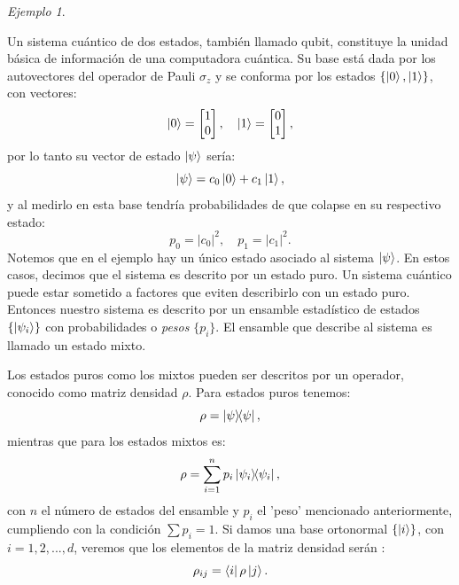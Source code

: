 \documentclass[letterpaper,12pt]{thesisECFM}
\theoremstyle{plain}
\theoremstyle{definition}
\theoremstyle{definition}
\theoremstyle{remark}
\newcommand{\1}{\mathbb{1}}
\newtheorem{ex}{Ejemplo}[section]
\begin{document}
\begin{ex} \label{ex: dens1}\end{ex}  
Un sistema cuántico de dos estados, también llamado qubit, constituye la unidad básica de información de una computadora cuántica. Su base está dada por los autovectores del operador de Pauli $\sigma_z$ y se conforma por los estados $\{\ket{0}, \ket{1}\}$, con vectores:
\begin{equation}
\ket{0} = \begin{bmatrix} 
    1 \\
    0 \\
    \end{bmatrix}, \quad \ket{1}=\begin{bmatrix} 
    0 \\
    1 \\
    \end{bmatrix},     
\end{equation} 
    por lo tanto su vector de estado $\ket{\psi}$ sería:
    \begin{equation}
      \ket{\psi} = c_0 \ket{0} + c_1 \ket{1},   
    \end{equation}
    y al medirlo en esta base tendría probabilidades de que colapse en su respectivo estado:
    \begin{equation}
     p_0=|c_0|^2, \quad p_1=|c_1|^2.
    \end{equation}
Notemos que en el ejemplo hay un único estado asociado al sistema $\ket{\psi}$.
En estos casos, decimos que el sistema es descrito por un estado puro.
Un sistema cuántico puede estar sometido a factores que eviten describirlo con
un estado puro.  Entonces nuestro sistema es descrito por un ensamble
estadístico de estados $\{\ket{\psi_i} \}$  con probabilidades o \textit{pesos}
$\{p_i\}$. El ensamble que describe al sistema  es llamado un estado mixto.

Los estados puros como los mixtos pueden ser descritos por un operador,
conocido como matriz densidad $\rho$. Para estados puros tenemos:
    \begin{equation}
        \label{ec:dens_puros}
        \rho = \ketbra{\psi},
    \end{equation}
mientras que para los estados mixtos es:
\begin{equation}
\label{dens_mixtos}
    \rho = \sum_{i=1}^{n} p_i \ketbra{\psi_i},
\end{equation}
con $n$ el número de estados del ensamble y $p_i$ el 'peso' mencionado
anteriormente, cumpliendo con la condición $\sum p_i =1$.
Si damos una base ortonormal $\{\ket{i}\}$, con $i=1,2,..., d$, veremos que los elementos de la
matriz densidad serán \cite{princip_quantum}:
\begin{equation}
    \label{eq:rho_ij}
    \rho_{ij} = \bra{i} \rho \ket{j}.
\end{equation}
   
\end{document}
